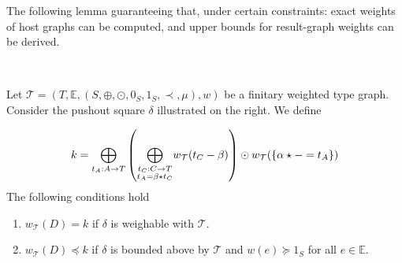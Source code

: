 The following lemma guaranteeing that, under certain constraints: exact weights of host graphs can be computed, and upper bounds for result-graph weights can be derived. 
\begin{lemma}
    \label{lem_4d13}
\ \newline
\begin{minipage}{0.7\textwidth}
    Let $\mathcal{T} = (T,\mathbb{E}, (S, \oplus, \odot, 0_S, 1_S, \prec, \mu), w)$ be a finitary weighted type graph. Consider the pushout square $\delta$ illustrated on the right. We define
\end{minipage}
\begin{minipage}{0.3\textwidth}
    \begin{center}{\normalfont
    }\end{center}
\end{minipage}
     \[k = \underset{t_A:A \rightarrow T}{\bigoplus}
            \left ( 
                \underset{\substack{t_C:C \rightarrow T\\
                                            t_A = \beta \star t_C }}{\bigoplus}
                        w_\mathcal{T}(t_C - \beta)     
                 \right ) 
            \odot 
                w_\mathcal{T}(\{\alpha \star - = t_A\})
    \]
    The following conditions hold
    \begin{enumerate}[label=(\Alph*)]
        \item  $w_\mathcal{T}(D)=k$ if $\delta$ is weighable with $\mathcal{T}$.
        \item  $w_\mathcal{T}(D)\preceq k$ if $\delta$ is bounded above by $\mathcal{T}$  and \(w(e) \succeq 1_S\) for all $e \in \mathbb{E}$.
    \end{enumerate}
\end{lemma}


